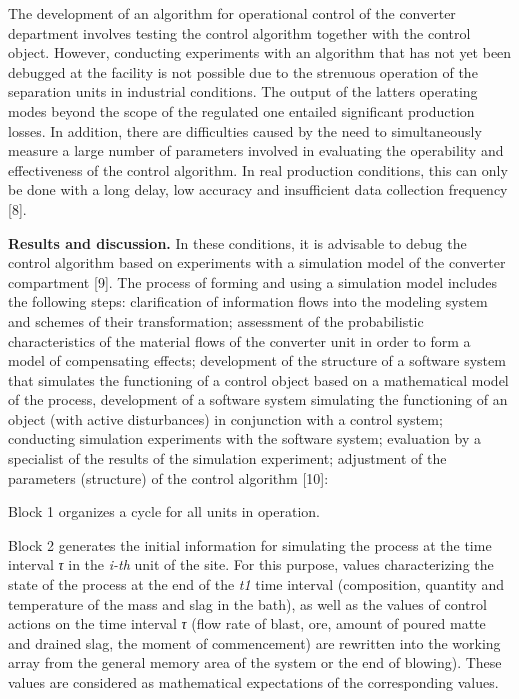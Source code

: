 The development of an algorithm for operational control of the converter
department involves testing the control algorithm together with the
control object. However, conducting experiments with an algorithm that
has not yet been debugged at the facility is not possible due to the
strenuous operation of the separation units in industrial conditions.
The output of the latter\textquotesingle s operating modes beyond the
scope of the regulated one entailed significant production losses. In
addition, there are difficulties caused by the need to simultaneously
measure a large number of parameters involved in evaluating the
operability and effectiveness of the control algorithm. In real
production conditions, this can only be done with a long delay, low
accuracy and insufficient data collection frequency {[}8{]}.

{\bfseries Results and discussion.} In these conditions, it is advisable to
debug the control algorithm based on experiments with a simulation model
of the converter compartment {[}9{]}. The process of forming and using a
simulation model includes the following steps: clarification of
information flows into the modeling system and schemes of their
transformation; assessment of the probabilistic characteristics of the
material flows of the converter unit in order to form a model of
compensating effects; development of the structure of a software system
that simulates the functioning of a control object based on a
mathematical model of the process, development of a software system
simulating the functioning of an object (with active disturbances) in
conjunction with a control system; conducting simulation experiments
with the software system; evaluation by a specialist of the results of
the simulation experiment; adjustment of the parameters (structure) of
the control algorithm {[}10{]}:

Block 1 organizes a cycle for all units in operation.

Block 2 generates the initial information for simulating the process at
the time interval \emph{τ} in the \emph{i-th} unit of the site. For this
purpose, values characterizing the state of the process at the end of
the \emph{t1} time interval (composition, quantity and temperature of
the mass and slag in the bath), as well as the values of control actions
on the time interval \emph{τ} (flow rate of blast, ore, amount of poured
matte and drained slag, the moment of commencement) are rewritten into
the working array from the general memory area of the system or the end
of blowing). These values are considered as mathematical expectations of
the corresponding values.

